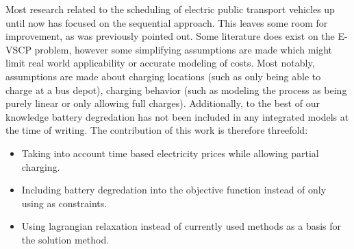 \documentclass[]{article}
\begin{document}
Most research related to the scheduling of electric public transport vehicles up until now has focused on the sequential approach. This leaves some room for improvement, as was previously pointed out. Some literature does exist on the E-VSCP problem, however some simplifying assumptions are made which might limit real world applicability or accurate modeling of costs. Most notably, assumptions are made about charging locations (such as only being able to charge at a bus depot), charging behavior (such as modeling the process as being purely linear or only allowing full charges). Additionally, to the best of our knowledge battery degredation has not been included in any integrated models at the time of writing. The contribution of this work is therefore threefold: 
\begin{itemize}
  \item Taking into account time based electricity prices while allowing partial charging. 
  \item Including battery degredation into the objective function instead of only using as constraints.
  \item Using lagrangian relaxation instead of currently used methods as a basis for the solution method. 
\end{itemize}
\end{document}

